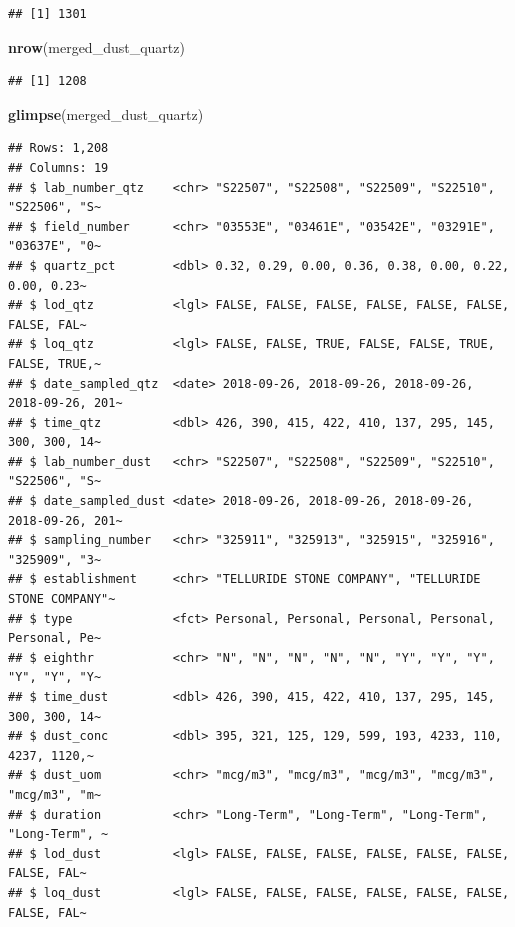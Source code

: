 \documentclass[
]{article}
\newenvironment{Shaded}{\begin{snugshade}}{\end{snugshade}}
\newcommand{\FunctionTok}[1]{\textcolor[rgb]{0.13,0.29,0.53}{\textbf{#1}}}
\newcommand{\NormalTok}[1]{#1}
\begin{document}
\begin{verbatim}
## [1] 1301
\end{verbatim}

\begin{Shaded}
\begin{Highlighting}[]
\FunctionTok{nrow}\NormalTok{(merged\_dust\_quartz) }
\end{Highlighting}
\end{Shaded}

\begin{verbatim}
## [1] 1208
\end{verbatim}

\begin{Shaded}
\begin{Highlighting}[]
\FunctionTok{glimpse}\NormalTok{(merged\_dust\_quartz) }
\end{Highlighting}
\end{Shaded}

\begin{verbatim}
## Rows: 1,208
## Columns: 19
## $ lab_number_qtz    <chr> "S22507", "S22508", "S22509", "S22510", "S22506", "S~
## $ field_number      <chr> "03553E", "03461E", "03542E", "03291E", "03637E", "0~
## $ quartz_pct        <dbl> 0.32, 0.29, 0.00, 0.36, 0.38, 0.00, 0.22, 0.00, 0.23~
## $ lod_qtz           <lgl> FALSE, FALSE, FALSE, FALSE, FALSE, FALSE, FALSE, FAL~
## $ loq_qtz           <lgl> FALSE, FALSE, TRUE, FALSE, FALSE, TRUE, FALSE, TRUE,~
## $ date_sampled_qtz  <date> 2018-09-26, 2018-09-26, 2018-09-26, 2018-09-26, 201~
## $ time_qtz          <dbl> 426, 390, 415, 422, 410, 137, 295, 145, 300, 300, 14~
## $ lab_number_dust   <chr> "S22507", "S22508", "S22509", "S22510", "S22506", "S~
## $ date_sampled_dust <date> 2018-09-26, 2018-09-26, 2018-09-26, 2018-09-26, 201~
## $ sampling_number   <chr> "325911", "325913", "325915", "325916", "325909", "3~
## $ establishment     <chr> "TELLURIDE STONE COMPANY", "TELLURIDE STONE COMPANY"~
## $ type              <fct> Personal, Personal, Personal, Personal, Personal, Pe~
## $ eighthr           <chr> "N", "N", "N", "N", "N", "Y", "Y", "Y", "Y", "Y", "Y~
## $ time_dust         <dbl> 426, 390, 415, 422, 410, 137, 295, 145, 300, 300, 14~
## $ dust_conc         <dbl> 395, 321, 125, 129, 599, 193, 4233, 110, 4237, 1120,~
## $ dust_uom          <chr> "mcg/m3", "mcg/m3", "mcg/m3", "mcg/m3", "mcg/m3", "m~
## $ duration          <chr> "Long-Term", "Long-Term", "Long-Term", "Long-Term", ~
## $ lod_dust          <lgl> FALSE, FALSE, FALSE, FALSE, FALSE, FALSE, FALSE, FAL~
## $ loq_dust          <lgl> FALSE, FALSE, FALSE, FALSE, FALSE, FALSE, FALSE, FAL~
\end{verbatim}
\end{document}

